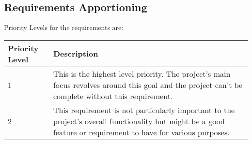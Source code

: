 \subsection{Requirements Apportioning}
Priority Levels for the requirements are:\\
\begin{longtable}{|l|p{10cm}|}
    \hline
    Priority Level & Description \\
    \hline

    1 & This is the highest level priority. The project's main focus revolves around this goal and the project can't be complete without this requirement.\\
    \hline
    2 & This requirement is not particularly important to the project's overall functionality but might be a good feature or requirement to have for various purposes.\\

    \hline
\end{longtable}
